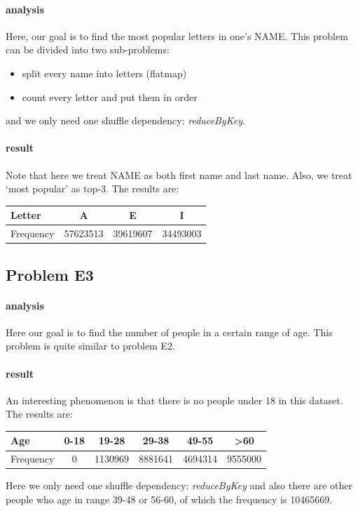 \documentclass{article}
\begin{document}
\paragraph{analysis}
Here, our goal is to find the most popular letters in one's NAME. This problem can be divided into two sub-problems:
\begin{itemize}
\item split every name into letters (flatmap)
\item count every letter and put them in order
\end{itemize}
and we only need one shuffle dependency: \emph{reduceByKey}.

\paragraph{result}
Note that here we treat NAME as both first name and last name. Also, we treat `most popular' as top-3. The results are:
\begin{table}[ht]
\centering
\begin{tabular}{lccc}
\toprule
Letter & A & E & I \\
\midrule
Frequency & 57623513 & 39619607 & 34493003 \\
\bottomrule
\end{tabular}
\end{table}


\subsection{Problem E3}
\paragraph{analysis}
Here our goal is to find the number of people in a certain range of age. This problem is quite similar to problem E2.

\paragraph{result}
An interesting phenomenon is that there is no people under 18 in this dataset. The results are:
\begin{table}[ht]
\centering
\begin{tabular}{lccccc}
\toprule
Age & 0-18 & 19-28 & 29-38 & 49-55 & >60 \\
\midrule
Frequency & 0 & 1130969 & 8881641 & 4694314 & 9555000 \\
\bottomrule
\end{tabular}
\end{table}
Here we only need one shuffle dependency: \emph{reduceByKey} and also there are other people who age in range 39-48 or 56-60, of which the frequency is 10465669.
\end{document}
